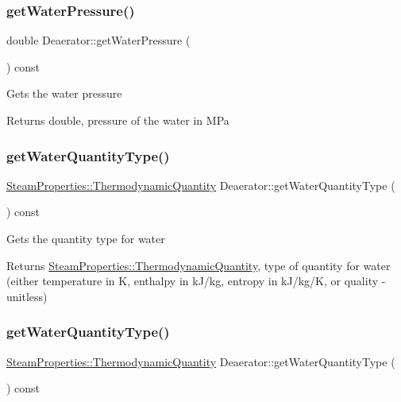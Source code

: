 \subsubsection{\texorpdfstring{get\+Water\+Pressure()}{getWaterPressure()}\hspace{0.1cm}{\footnotesize\ttfamily [3/3]}}
{\footnotesize\ttfamily double Deaerator\+::get\+Water\+Pressure (\begin{DoxyParamCaption}{ }\end{DoxyParamCaption}) const}

Gets the water pressure \begin{DoxyReturn}{Returns}
double, pressure of the water in M\+Pa 
\end{DoxyReturn}
\mbox{\label{class_deaerator_a414282f81906e09a28bc75cf51659ec2}} 
\subsubsection{\texorpdfstring{get\+Water\+Quantity\+Type()}{getWaterQuantityType()}\hspace{0.1cm}{\footnotesize\ttfamily [1/3]}}
{\footnotesize\ttfamily \hyperlink{class_steam_properties_ae0294bedf7d178c2d8fb6aed0f62fbff}{Steam\+Properties\+::\+Thermodynamic\+Quantity} Deaerator\+::get\+Water\+Quantity\+Type (\begin{DoxyParamCaption}{ }\end{DoxyParamCaption}) const}

Gets the quantity type for water \begin{DoxyReturn}{Returns}
\hyperlink{class_steam_properties_ae0294bedf7d178c2d8fb6aed0f62fbff}{Steam\+Properties\+::\+Thermodynamic\+Quantity}, type of quantity for water (either temperature in K, enthalpy in k\+J/kg, entropy in k\+J/kg/K, or quality -\/ unitless) 
\end{DoxyReturn}
\mbox{\label{class_deaerator_a414282f81906e09a28bc75cf51659ec2}} 
\subsubsection{\texorpdfstring{get\+Water\+Quantity\+Type()}{getWaterQuantityType()}\hspace{0.1cm}{\footnotesize\ttfamily [2/3]}}
{\footnotesize\ttfamily \hyperlink{class_steam_properties_ae0294bedf7d178c2d8fb6aed0f62fbff}{Steam\+Properties\+::\+Thermodynamic\+Quantity} Deaerator\+::get\+Water\+Quantity\+Type (\begin{DoxyParamCaption}{ }\end{DoxyParamCaption}) const}

